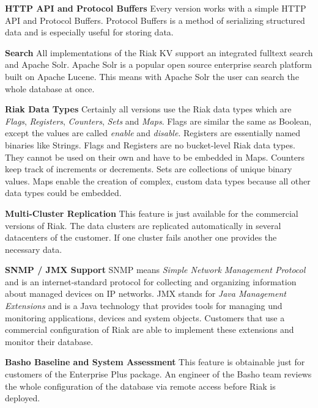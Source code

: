 \textbf{HTTP API and Protocol Buffers}\newline
Every version works with a simple HTTP API and Protocol Buffers. Protocol Buffers is a method of serializing structured data and is especially useful for storing data. 

\textbf{Search}\newline
All implementations of the Riak KV support an integrated fulltext search and Apache Solr. Apache Solr is a popular open source enterprise search platform  built on Apache Lucene. This means with Apache Solr the user can search the whole database at once.

\textbf{Riak Data Types}\newline
Certainly all versions use the Riak data types which are \textit{Flags}, \textit{Registers}, \textit{Counters}, \textit{Sets} and \textit{Maps}. Flags are similar the same as Boolean, except the values are called \textit{enable} and \textit{disable}. Registers are essentially named binaries like Strings. Flags and Registers are no bucket-level Riak data types. They cannot be used on their own and have to be embedded in Maps. Counters keep track of increments or decrements. Sets are collections of unique binary values. Maps enable the creation of complex, custom data types because all other data types could be embedded.

\textbf{Multi-Cluster Replication}\newline
This feature is just available for the commercial versions of Riak. The data clusters are replicated automatically in several datacenters of the customer. If one cluster fails another one provides the necessary data. 

\textbf{SNMP / JMX Support}\newline
SNMP means \textit{Simple Network Management Protocol} and is an internet-standard protocol for collecting and organizing information about managed devices on IP networks. JMX stands for \textit{Java Management Extensions} and is a Java technology that provides tools for managing und monitoring applications, devices and system objects. Customers that use a commercial configuration of Riak are able to implement these extensions and monitor their database.

\newpage

\textbf{Basho Baseline and System Assessment}\newline
This feature is obtainable just for customers of the Enterprise Plus package. An engineer of the Basho team reviews the whole configuration of the database via remote access before Riak is deployed. 


